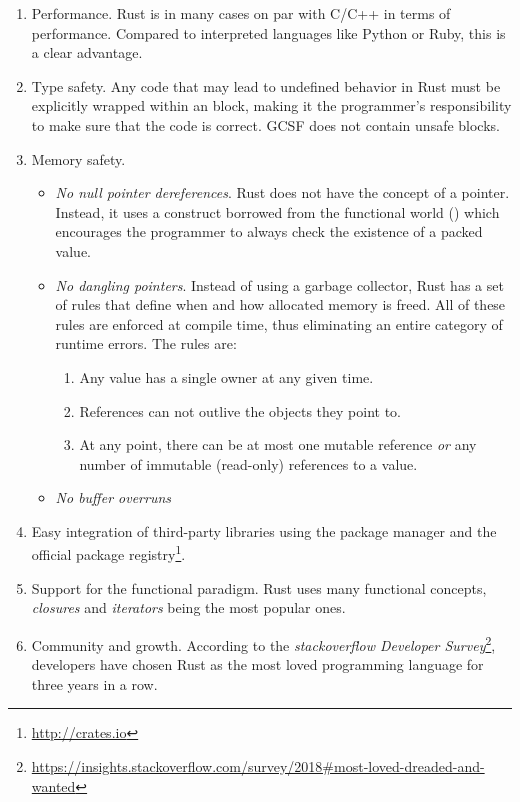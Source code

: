 \begin{enumerate}
  \item Performance. Rust is in many cases on par with C/C++ in terms of performance. Compared to interpreted languages like Python or Ruby, this is a clear advantage.
  \item Type safety. Any code that may lead to undefined behavior in Rust must be explicitly wrapped within an  block, making it the programmer's responsibility to make sure that the code is correct. GCSF does not contain unsafe blocks.
  \item Memory safety.
    \begin{itemize}
      \item \emph{No null pointer dereferences}. Rust does not have the concept of a  pointer. Instead, it uses a construct borrowed from the functional world () which encourages the programmer to always check the existence of a packed value.
      \item \emph{No dangling pointers}. Instead of using a garbage collector, Rust has a set of rules that define when and how allocated memory is freed. All of these rules are enforced at compile time, thus eliminating an entire category of runtime errors. The rules are:
      \begin{enumerate}
        \item Any value has a single owner at any given time.
        \item References can not outlive the objects they point to.
        \item At any point, there can be at most one mutable reference \emph{or} any number of immutable (read-only) references to a value.
      \end{enumerate}
      \item \emph{No buffer overruns}
    \end{itemize}
  \item Easy integration of third-party libraries using the  package manager and the official package registry\footnote{\url{http://crates.io}}.
  \item Support for the functional paradigm. Rust uses many functional concepts, \emph{closures} and \emph{iterators} being the most popular ones.
  \item Community and growth. According to the \emph{stackoverflow Developer Survey}\footnote{\url{https://insights.stackoverflow.com/survey/2018#most-loved-dreaded-and-wanted}}, developers have chosen Rust as the most loved programming language for three years in a row.
\end{enumerate}

